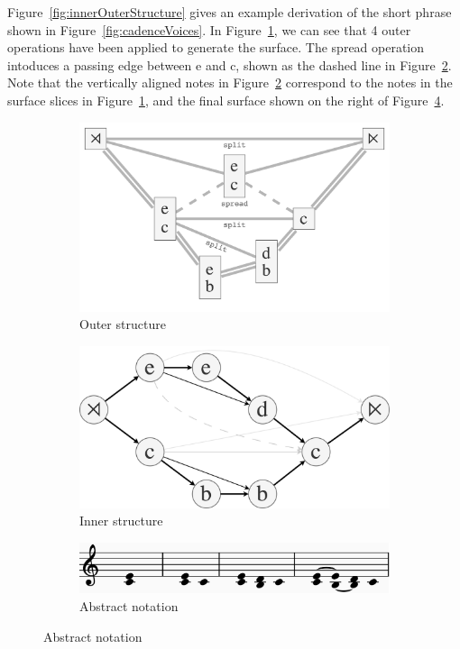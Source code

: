 \documentclass[12pt,a4paper,twoside,openright]{report}
\theoremstyle{definition}
\begin{document}
Figure~\ref{fig:innerOuterStructure} gives an example derivation of the short phrase shown in Figure~\ref{fig:cadenceVoices}. In Figure~\ref{fig:cadenceOuterDer}, we can see that 4 outer operations have been applied to generate the surface. The spread operation intoduces a passing edge between e and c, shown as the dashed line in Figure~\ref{fig:cadenceInnerDer}. Note that the vertically aligned notes in Figure~\ref{fig:cadenceInnerDer} correspond to the notes in the surface slices in Figure~\ref{fig:cadenceOuterDer}, and the final surface shown on the right of Figure~\ref{fig:cadenceDerivation}.
\begin{figure}
  \centering
  \begin{subfigure}[t]{.55\textwidth}
    \centering\includegraphics[keepaspectratio,width=\textwidth]{prep/cadenceouterder.png}
    \caption{Outer structure}
    \label{fig:cadenceOuterDer}
  \end{subfigure}
  \begin{subfigure}[t]{.42\textwidth}
    \centering\includegraphics[keepaspectratio,width=\textwidth]{prep/cadenceinnerder.png}
    \caption{Inner structure}
    \label{fig:cadenceInnerDer}
  \end{subfigure}
  \begin{subfigure}[t]{.8\textwidth}
    \centering\includegraphics[keepaspectratio,width=\textwidth]{prep/cadencederivation.png}
    \caption{Abstract notation}
    \label{fig:cadenceDerivation}
  \end{subfigure}



\end{figure}
\end{document}
